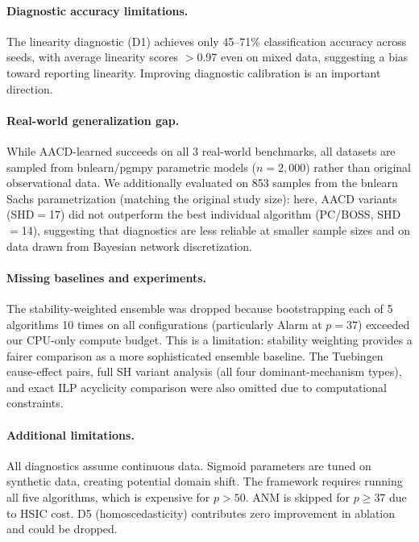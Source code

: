 \documentclass{article}
\newcommand{\aacd}{\textsc{AACD}}
\begin{document}
\paragraph{Diagnostic accuracy limitations.} The linearity diagnostic (D1) achieves only 45--71\% classification accuracy across seeds, with average linearity scores $>$0.97 even on mixed data, suggesting a bias toward reporting linearity. Improving diagnostic calibration is an important direction.

\paragraph{Real-world generalization gap.} While \aacd{}-learned succeeds on all 3 real-world benchmarks, all datasets are sampled from bnlearn/pgmpy parametric models ($n{=}2{,}000$) rather than original observational data. We additionally evaluated on 853 samples from the bnlearn Sachs parametrization (matching the original study size): here, \aacd{} variants (SHD$=$17) did not outperform the best individual algorithm (PC/BOSS, SHD$=$14), suggesting that diagnostics are less reliable at smaller sample sizes and on data drawn from Bayesian network discretization.

\paragraph{Missing baselines and experiments.} The stability-weighted ensemble was dropped because bootstrapping each of 5 algorithms 10 times on all configurations (particularly Alarm at $p{=}37$) exceeded our CPU-only compute budget. This is a limitation: stability weighting provides a fairer comparison as a more sophisticated ensemble baseline. The Tuebingen cause-effect pairs, full SH variant analysis (all four dominant-mechanism types), and exact ILP acyclicity comparison were also omitted due to computational constraints.

\paragraph{Additional limitations.} All diagnostics assume continuous data. Sigmoid parameters are tuned on synthetic data, creating potential domain shift. The framework requires running all five algorithms, which is expensive for $p > 50$. ANM is skipped for $p \geq 37$ due to HSIC cost. D5 (homoscedasticity) contributes zero improvement in ablation and could be dropped.

\end{document}

